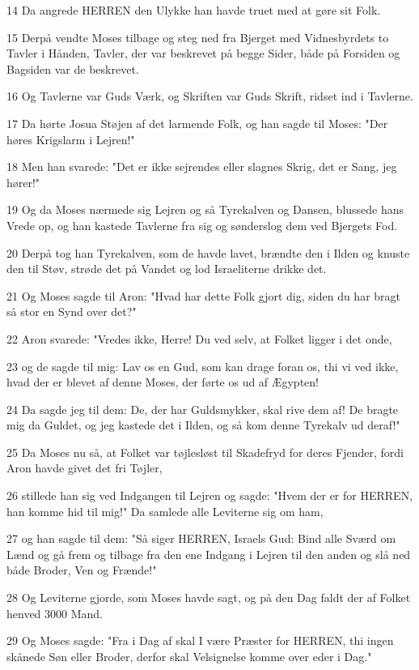 \par 14 Da angrede HERREN den Ulykke han havde truet med at gøre sit Folk.
\par 15 Derpå vendte Moses tilbage og steg ned fra Bjerget med Vidnesbyrdets to Tavler i Hånden, Tavler, der var beskrevet på begge Sider, både på Forsiden og Bagsiden var de beskrevet.
\par 16 Og Tavlerne var Guds Værk, og Skriften var Guds Skrift, ridset ind i Tavlerne.
\par 17 Da hørte Josua Støjen af det larmende Folk, og han sagde til Moses: "Der høres Krigslarm i Lejren!"
\par 18 Men han svarede: "Det er ikke sejrendes eller slagnes Skrig, det er Sang, jeg hører!"
\par 19 Og da Moses nærmede sig Lejren og så Tyrekalven og Dansen, blussede hans Vrede op, og han kastede Tavlerne fra sig og sønderslog dem ved Bjergets Fod.
\par 20 Derpå tog han Tyrekalven, som de havde lavet, brændte den i Ilden og knuste den til Støv, strøde det på Vandet og lod Israeliterne drikke det.
\par 21 Og Moses sagde til Aron: "Hvad har dette Folk gjort dig, siden du har bragt så stor en Synd over det?"
\par 22 Aron svarede: "Vredes ikke, Herre! Du ved selv, at Folket ligger i det onde,
\par 23 og de sagde til mig: Lav os en Gud, som kan drage foran os, thi vi ved ikke, hvad der er blevet af denne Moses, der førte os ud af Ægypten!
\par 24 Da sagde jeg til dem: De, der har Guldsmykker, skal rive dem af! De bragte mig da Guldet, og jeg kastede det i Ilden, og så kom denne Tyrekalv ud deraf!"
\par 25 Da Moses nu så, at Folket var tøjlesløst til Skadefryd for deres Fjender, fordi Aron havde givet det fri Tøjler,
\par 26 stillede han sig ved Indgangen til Lejren og sagde: "Hvem der er for HERREN, han komme hid til mig!" Da samlede alle Leviterne sig om ham,
\par 27 og han sagde til dem: "Så siger HERREN, Israels Gud: Bind alle Sværd om Lænd og gå frem og tilbage fra den ene Indgang i Lejren til den anden og slå ned både Broder, Ven og Frænde!"
\par 28 Og Leviterne gjorde, som Moses havde sagt, og på den Dag faldt der af Folket henved 3000 Mand.
\par 29 Og Moses sagde: "Fra i Dag af skal I være Præster for HERREN, thi ingen skånede Søn eller Broder, derfor skal Velsignelse komme over eder i Dag."
